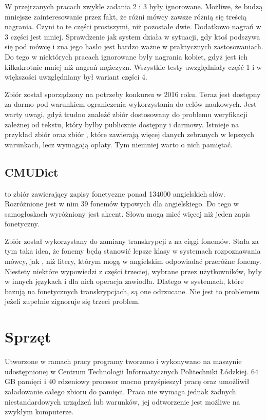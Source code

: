 W przejrzanych pracach zwykle zadania 2 i 3 były ignorowane. Możliwe, że budzą mniejsze zainteresowanie przez fakt,
że różni mówcy zawsze różnią się treścią nagrania. Czyni to te części prostszymi, niż pozostałe dwie.
Dodatkowo nagrań w 3 części jest mniej.
Sprawdzenie jak system działa w sytuacji, gdy ktoś podszywa się pod mówcę i zna jego hasło jest bardzo
ważne w praktycznych zastosowaniach.  Do tego w niektórych pracach ignorowane
były nagrania kobiet, gdyż jest ich kilkakrotnie mniej niż nagrań mężczyzn.
Wszystkie testy uwzględniały część 1 i w większości uwzględniany był wariant części 4.

Zbiór został sporządzony na potrzeby konkursu w 2016 roku. Teraz jest dostępny za darmo pod warunkiem
ograniczenia wykorzystania do celów naukowych. Jest warty uwagi, gdyż trudno znaleźć
zbiór dostosowany do problemu weryfikacji zależnej od tekstu, który byłby publicznie dostępny i darmowy.
Istnieje na przykład zbiór  oraz zbiór , które
zawierają więcej danych zebranych w lepszych warunkach, lecz wymagają opłaty. Tym niemniej warto
o nich pamiętać.

\subsection{CMUDict}

 to zbiór zawierający zapisy fonetyczne ponad 134000 angielskich słów. Rozróżnione
jest w nim 39 fonemów typowych dla angielskiego. Do tego w samogłoskach wyróżniony jest akcent.
Słowa mogą mieć więcej niż jeden zapis fonetyczny.

Zbiór został wykorzystany do zamiany transkrypcji z  na ciągi fonemów. Stała
za tym taka idea, że fonemy będą stanowić lepsze klasy w systemach rozpoznawania mówcy, jak
, niż litery, którym mogą w angielskim odpowiadać przeróżne fonemy.
Niestety niektóre wypowiedzi z części trzeciej, wybrane przez użytkowników, były w innych językach
i dla nich operacja zawiodła. Dlatego w systemach, które bazują na fonetycznych transkrypcjach,
są one odrzucane. Nie jest to problemem jeżeli zupełnie zignoruje się trzeci problem.

\section{Sprzęt}\label{sec:sprzet}

Utworzone w ramach pracy programy tworzono i wykonywano na maszynie udostępnionej
w Centrum Technologii Informatycznych Politechniki Łódzkiej. $64$GB pamięci i $40$ rdzeniowy
procesor mocno przyśpieszył pracę oraz umożliwił załadowanie całego zbioru do pamięci.
Praca nie wymaga jednak żadnych niestandardowych urządzeń lub warunków, jej odtworzenie
jest możliwe na zwykłym komputerze.

